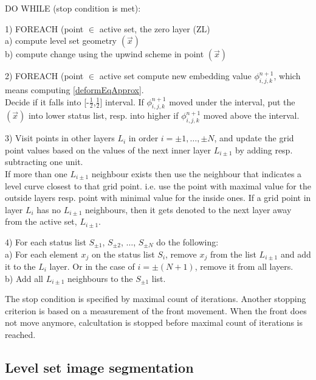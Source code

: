 \par
DO WHILE (stop condition is met):
\par
1) FOREACH (point $\in$ active set, the zero layer (ZL)\\
  a) compute level set geometry $(\vec x)$\\
  b) compute change using the upwind scheme in point $(\vec x)$
\par
2) FOREACH (point $\in$ active set compute new embedding value $\phi_{i,j,k}^{n+1}$, which means computing \ref{deformEqApprox}.\\
Decide if it falls into [-$\frac{1}{2}$,$\frac{1}{2}$] interval.
If $\phi_{i,j,k}^{n+1}$ moved under the interval, put the $(\vec x)$ into lower status list, resp. into higher if $\phi_{i,j,k}^{n+1}$ moved above the interval.
\par
3) Visit points in other layers $L_i$ in order $i=\pm 1,\ldots, \pm N$, and update the grid point values based on the values of the next inner layer $L_{i\pm1}$ by adding resp. subtracting one unit.\\
If more than one $L_{i\pm1}$ neighbour exists then use the neighbour that indicates a level curve closest to that grid point. i.e. use the point with maximal value for the outside layers resp. point with minimal value for the inside ones.
If a grid point in layer $L_i$ has no $L_{i\pm1}$ neighbours, then it gets denoted to the next layer away from the active set, $L_{i\pm1}$.\\
\par
4) For each status list $S_{\pm1}$, $S_{\pm2}$, $\ldots$, $S_{\pm N}$ do the following:\\
  a) For each element $x_j$ on the status list $S_i$, remove $x_j$ from the list $L_{i\pm1}$ and add it to the $L_{i}$ layer.
Or in the case of $i=\pm (N + 1)$, remove it from all layers.\\
  b) Add all $L_{i\pm1}$ neighbours to the $S_{\pm1}$ list.

\par
The stop condition is specified by maximal count of iterations.
Another stopping criterion is based on a measurement of the front movement.
When the front does not move anymore, calcultation is stopped before maximal count of iterations is reached.

\subsection{Level set image segmentation}


